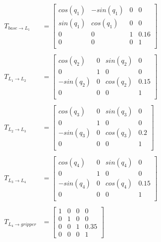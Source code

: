 \begin{align*}
    T_{base \rightarrow L_1} &=
        \begin{bmatrix}
            cos(q_1) & - sin(q_1) & 0 & 0 \\
            sin(q_1) &   cos(q_1) & 0 & 0 \\
                   0 &          0 & 1 & 0.16 \\
                   0 &          0 & 0 & 1 \\
        \end{bmatrix} \\
    \\
    T_{L_1 \rightarrow L_2} &=
        \begin{bmatrix}
              cos(q_2) & 0 & sin(q_2) & 0 \\
                     0 & 1 &        0 & 0 \\
            - sin(q_2) & 0 & cos(q_2) & 0.15 \\
                     0 & 0 &        0 & 1 \\
        \end{bmatrix} \\
    \\
    T_{L_2 \rightarrow L_3} &=
        \begin{bmatrix}
              cos(q_3) & 0 & sin(q_3) & 0 \\
                     0 & 1 &        0 & 0 \\
            - sin(q_3) & 0 & cos(q_3) & 0.2 \\
                     0 & 0 &        0 & 1 \\
        \end{bmatrix} \\
    \\
    T_{L_3 \rightarrow L_4} &=
        \begin{bmatrix}
              cos(q_4) & 0 & sin(q_4) & 0 \\
                     0 & 1 &        0 & 0 \\
            - sin(q_4) & 0 & cos(q_4) & 0.15 \\
                     0 & 0 &        0 & 1 \\
        \end{bmatrix} \\
    \\
    T_{L_4 \rightarrow gripper} &=
        \begin{bmatrix}
            1 & 0 & 0 & 0 \\
            0 & 1 & 0 & 0 \\
            0 & 0 & 1 & 0.35 \\
            0 & 0 & 0 & 1
        \end{bmatrix}
\end{align*}

